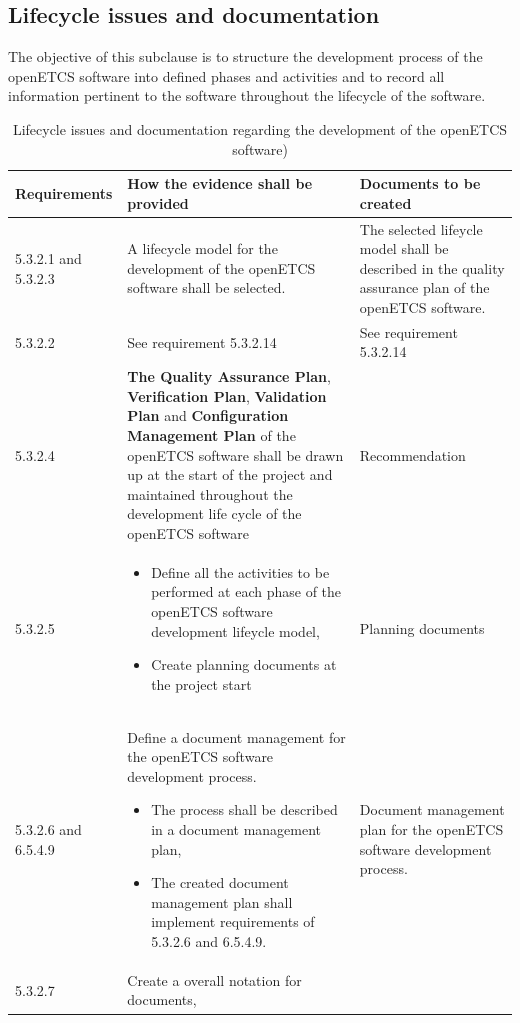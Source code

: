 \documentclass{template/openetcs_report}
\begin{document}
\subsection{Lifecycle issues and documentation}
\label{SDLC2}
\begin{flushleft}
The objective of this subclause is to structure the development process of the openETCS software into defined phases and activities and to record all information pertinent to the software throughout the lifecycle of the software.
\end{flushleft}
{\footnotesize\sffamily\centering
\begin{longtable}{|p{2cm}|p{9cm}|p{3cm}|}
\caption{Lifecycle issues and documentation regarding the development of the openETCS software)}\\
\hline
\bfseries Requirements & \bfseries How the evidence shall be provided & \bfseries Documents to be created\\
\hline
\hline
\endhead
\hline
\endfoot

5.3.2.1 and 5.3.2.3 & A lifecycle model for the development of the openETCS software shall be selected.
& The selected lifeycle model shall be described in the quality assurance plan of the openETCS software.\\ 
\hline
5.3.2.2 & See requirement 5.3.2.14 & See requirement 5.3.2.14\\ 
\hline
5.3.2.4 & \textbf{The Quality Assurance Plan}, \textbf{Verification Plan}, \textbf{Validation Plan} and \textbf{Configuration Management Plan} of the openETCS software shall be drawn up at the start of the project and maintained throughout the development life cycle of the openETCS software & Recommendation\\ 
\hline
5.3.2.5 & 
\begin{itemize}\itemsep=0pt
  \item Define all the activities to be performed at each phase of the openETCS software
development lifeycle model,
  \item Create planning documents at the project start
\end{itemize} 
& Planning documents\\ 
\hline
5.3.2.6 and 6.5.4.9 & Define a document management for the openETCS software development process. 
\begin{itemize}\itemsep=0pt
  \item The process shall be described in a document management plan,
  \item The created document management plan shall implement requirements of 5.3.2.6 and 6.5.4.9.
\end{itemize} 
& Document management plan for the openETCS software development
process.\\ 
\hline
5.3.2.7 & Create a overall notation for documents,


\end{longtable}}
\end{document}
